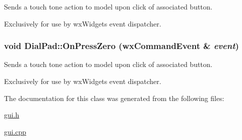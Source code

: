 Sends a touch tone action to model upon click of associated button. 

Exclusively for use by wxWidgets event dispatcher. \hypertarget{classDialPad_4e71463b25b3004ea30cfc64c298a03c}{
\subsubsection[{OnPressZero}]{\setlength{\rightskip}{0pt plus 5cm}void DialPad::OnPressZero (wxCommandEvent \& {\em event})}}
\label{classDialPad_4e71463b25b3004ea30cfc64c298a03c}


Sends a touch tone action to model upon click of associated button. 

Exclusively for use by wxWidgets event dispatcher. 

The documentation for this class was generated from the following files:\begin{CompactItemize}
\item 
\hyperlink{gui_8h}{gui.h}\item 
\hyperlink{gui_8cpp}{gui.cpp}\end{CompactItemize}
